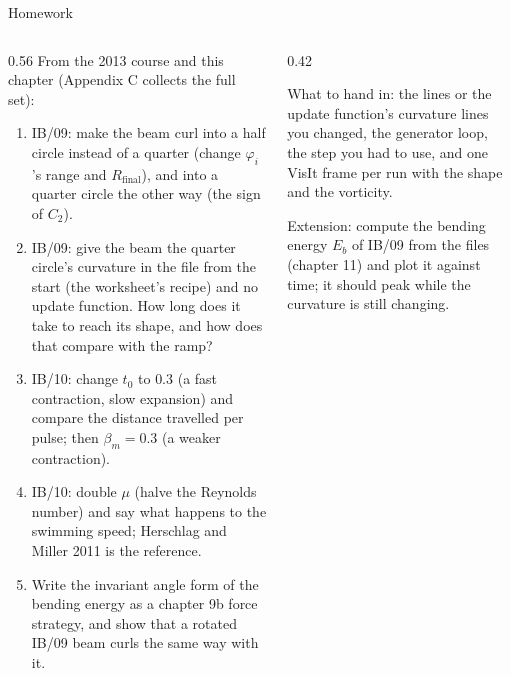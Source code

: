 \documentclass[aspectratio=169,11pt]{beamer}
\begin{document}
\begin{frame}{Homework}
\label{fr:hw}
\begin{columns}[T,onlytextwidth]
\begin{column}{0.56\textwidth}
\footnotesize From the 2013 course and this chapter (Appendix C collects the full set):
\begin{enumerate}
  \item IB/09: make the beam curl into a half circle instead of a quarter (change $\varphi_i$'s range and $R_{\mathrm{final}}$), and into a quarter circle the other way (the sign of $C_2$).
  \item IB/09: give the beam the quarter circle's curvature in the  file from the start (the worksheet's recipe) and no update function. How long does it take to reach its shape, and how does that compare with the ramp?
  \item IB/10: change $t_0$ to $0.3$ (a fast contraction, slow expansion) and compare the distance travelled per pulse; then $\beta_m = 0.3$ (a weaker contraction).
  \item IB/10: double $\mu$ (halve the Reynolds number) and say what happens to the swimming speed; Herschlag and Miller 2011 is the reference.
  \item Write the invariant angle form of the bending energy as a chapter 9b force strategy, and show that a rotated IB/09 beam curls the same way with it.
\end{enumerate}
\end{column}
\begin{column}{0.42\textwidth}
\begin{punchbox}
\scriptsize What to hand in: the  lines or the update function's curvature lines you changed, the generator loop, the step you had to use, and one VisIt frame per run with the shape and the vorticity.
\end{punchbox}
\scriptsize Extension: compute the bending energy $E_b$ of IB/09 from the  files (chapter 11) and plot it against time; it should peak while the curvature is still changing.
\end{column}
\end{columns}
\end{frame}
\end{document}
